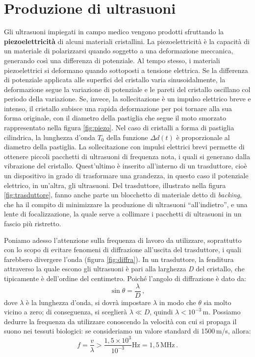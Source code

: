 \documentclass{report}
\newcommand{\virgolette}[1]{``#1''}
\newcommand{\figref}[1]{figura \ref{#1}}
\numberwithin{equation}{section}
\numberwithin{figure}{section}
\begin{document}
\section{Produzione di ultrasuoni}
Gli ultrasuoni impiegati in campo medico vengono prodotti sfruttando la \textbf{piezoelettricità} di alcuni materiali cristallini. La piezoelettricità è la capacità di un materiale di polarizzarsi quando soggetto a una deformazione meccanica, generando così una differenza di potenziale. Al tempo stesso, i materiali piezoelettrici si deformano quando sottoposti a tensione elettrica. Se la differenza di potenziale applicata alle superfici del cristallo varia sinusoidalmente, la deformazione segue la variazione di potenziale e le pareti del cristallo oscillano col periodo della variazione. Se, invece, la sollecitazione è un impulso elettrico breve e intenso, il cristallo subisce una rapida deformazione per poi tornare alla sua forma originale, con il diametro della pastiglia che segue il moto smorzato rappresentato nella \figref{fig:piezo}. Nel caso di cristalli a forma di pastiglia cilindrica, la lunghezza d'onda $T_0$ della funzione $\Delta d(t)$ è proporzionale al diametro della pastiglia. La sollecitazione con impulsi elettrici brevi permette di ottenere piccoli pacchetti di ultrasuoni di frequenza nota, i quali si generano dalla vibrazione del cristallo. Quest'ultimo è inserito all'interno di un trasduttore, cioè un dispositivo in grado di trasformare una grandezza, in questo caso il potenziale elettrico, in un'altra, gli ultrasuoni. Del trasduttore, illustrato nella \figref{fig:trasduttore}, fanno anche parte un blocchetto di materiale detto di \textit{backing}, che ha il compito di minimizzare la produzione di ultrasuoni \virgolette{all'indietro}, e una lente di focalizzazione, la quale serve a collimare i pacchetti di ultrasuoni in un fascio più ristretto.

Poniamo adesso l'attenzione sulla frequenza di lavoro da utilizzare, soprattutto con lo scopo di evitare fenomeni di diffrazione all'uscita del trasduttore, i quali farebbero divergere l'onda (\figref{fig:diffra}). In un trasduttore, la fenditura attraverso la quale escono gli ultrasuoni è pari alla larghezza \textit{D} del cristallo, che tipicamente è dell'ordine del centimetro. Poiché l'angolo di diffrazione è dato da:
\begin{equation}
    \sin{\theta} = \frac{\lambda}{D}\,,
\end{equation}
dove $\lambda$ è la lunghezza d'onda, si dovrà impostare $\lambda$ in modo che $\theta$ sia molto vicino a zero; di conseguenza, si sceglierà $\lambda \ll D$, quindi $\lambda < 10^{-3}$\,m. Possiamo dedurre la frequenza da utilizzare conoscendo la velocità con cui si propaga il suono nei tessuti biologici: se consideriamo un valore standard di 1500\,m/s, allora:
\begin{equation*}
    f = \frac{v}{\lambda} > \frac{1,5 \times 10^3}{10^{-3}} \text{Hz} = 1,5\,\text{MHz}\,.
\end{equation*}
\end{document}
